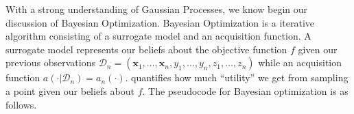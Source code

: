 With a strong understanding of Gaussian Processes, we know begin our discussion of Bayesian
Optimization.
Bayesian Optimization is a iterative algorithm consisting of a surrogate model and an acquisition function.
A surrogate model represents our beliefs about the objective function $f$ given our previous observations 
$\mathcal{D}_n = (\mathbf{x}_1, \ldots, \mathbf{x}_n, y_1, \ldots, y_n, z_1, \ldots, z_n)$
while
an acquisition function $a( \cdot | \mathcal{D}_n) = a_n(\cdot)$.
quantifies how much ``utility'' we get from sampling a point given our beliefs about $f$.
The pseudocode for Bayesian optimization is as follows.

